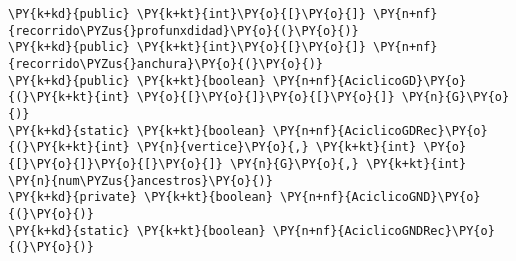 \begin{Verbatim}[commandchars=\\\{\}]
\PY{k+kd}{public} \PY{k+kt}{int}\PY{o}{[}\PY{o}{]} \PY{n+nf}{recorrido\PYZus{}profunxdidad}\PY{o}{(}\PY{o}{)}
\PY{k+kd}{public} \PY{k+kt}{int}\PY{o}{[}\PY{o}{]} \PY{n+nf}{recorrido\PYZus{}anchura}\PY{o}{(}\PY{o}{)}
\PY{k+kd}{public} \PY{k+kt}{boolean} \PY{n+nf}{AciclicoGD}\PY{o}{(}\PY{k+kt}{int} \PY{o}{[}\PY{o}{]}\PY{o}{[}\PY{o}{]} \PY{n}{G}\PY{o}{)}
\PY{k+kd}{static} \PY{k+kt}{boolean} \PY{n+nf}{AciclicoGDRec}\PY{o}{(}\PY{k+kt}{int} \PY{n}{vertice}\PY{o}{,} \PY{k+kt}{int} \PY{o}{[}\PY{o}{]}\PY{o}{[}\PY{o}{]} \PY{n}{G}\PY{o}{,} \PY{k+kt}{int} \PY{n}{num\PYZus{}ancestros}\PY{o}{)}
\PY{k+kd}{private} \PY{k+kt}{boolean} \PY{n+nf}{AciclicoGND}\PY{o}{(}\PY{o}{)} 
\PY{k+kd}{static} \PY{k+kt}{boolean} \PY{n+nf}{AciclicoGNDRec}\PY{o}{(}\PY{o}{)}
\end{Verbatim}
